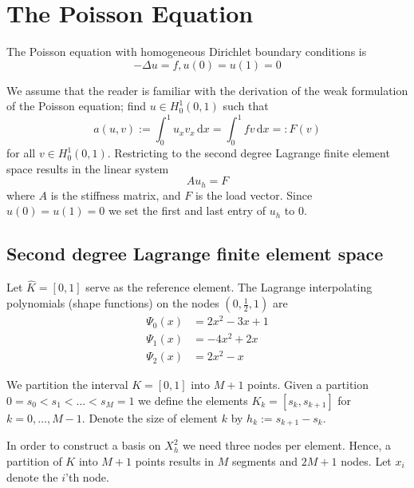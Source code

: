 \section{The Poisson Equation}

The Poisson equation with homogeneous Dirichlet boundary conditions is
\begin{equation}
    - \Delta u = f, u(0) = u(1) = 0
\end{equation}

We assume that the reader is familiar with the
derivation of the weak formulation of the Poisson equation;
find \( u \in H_0^1(0, 1) \) such that
\begin{equation}
  \label{eq:weak}
    a(u, v) := \int_{0}^{1}u_x v_x \,\mathrm{d}x = \int_{0}^{1}f v \,\mathrm{d}x =: F(v)
\end{equation}
for all \( v \in H^1_0 (0,1)\).
Restricting to the second degree Lagrange finite element space
results in the linear system
\begin{equation}
    Au_h = F
\end{equation}
where \( A \) is the stiffness matrix,
and \( F \) is the load vector.
Since \( u(0) = u(1) = 0 \) we set
the first and last entry of \( u_h \)
to \( 0 \).

\subsection{Second degree Lagrange finite element space}\label{sec:sec}

Let \( \hat{K} = [0, 1] \) serve as the reference element.
The Lagrange interpolating polynomials (shape functions)
on the nodes \( (0, \frac{1}{2}, 1) \) are
\begin{equation} \label{eq:Lagrange_nodes}
\begin{split}
  \Psi_0(x) &= 2x^2 - 3x + 1\\
  \Psi_1(x) &= -4x^2 + 2x\\
  \Psi_2(x) &= 2x^2 - x
\end{split}
\end{equation}

We partition the interval \( K = [0, 1] \) into \( M + 1 \) points.
Given a partition \( 0 = s_0 < s_1 < \dots < s_M = 1  \)
we define the elements \( K_k = [s_{k}, s_{k+1}] \) for $k = 0, \dots, M-1$.
Denote the size of element \( k \) by \( h_k := s_{k+1} - s_{k} \).

In order to construct a basis on \( X_h^2 \) we need three
nodes per element.
Hence, a partition of \( K \) into \( M + 1 \) points
results in \( M \) segments and \( 2M + 1 \) nodes.
Let \( x_i \) denote the \( i \)'th node.

